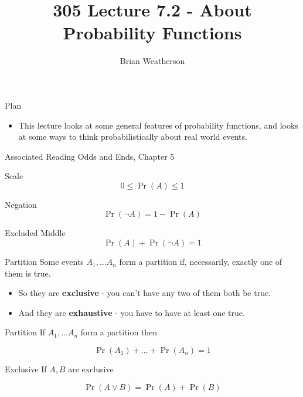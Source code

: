 \documentclass[
  ignorenonframetext,
]{beamer}
\title{305 Lecture 7.2 - About Probability Functions}
\author{Brian Weatherson}
\date{}
\providecommand{\tightlist}{%
  \setlength{\itemsep}{0pt}\setlength{\parskip}{0pt}}
\renewcommand{\,}{\text{, }}
\begin{document}
\frame{\titlepage}

\begin{frame}{Plan}
\protect\hypertarget{plan}{}
\begin{itemize}
\tightlist
\item
  This lecture looks at some general features of probability functions,
  and looks at some ways to think probabilistically about real world
  events.
\end{itemize}
\end{frame}

\begin{frame}{Associated Reading}
\protect\hypertarget{associated-reading}{}
Odds and Ends, Chapter 5
\end{frame}

\begin{frame}{Scale}
\protect\hypertarget{scale}{}
\[
0 \leq \Pr(A) \leq 1
\]
\end{frame}

\begin{frame}{Negation}
\protect\hypertarget{negation}{}
\[
\Pr(\neg A) = 1 - \Pr(A)
\]
\end{frame}

\begin{frame}{Excluded Middle}
\protect\hypertarget{excluded-middle}{}
\[
\Pr(A) + \Pr(\neg A) = 1
\]
\end{frame}

\begin{frame}{Partition}
\protect\hypertarget{partition}{}
Some events \(A_1, \dots A_n\) form a partition if, necessarily, exactly
one of them is true.

\begin{itemize}
\tightlist
\item
  So they are \textbf{exclusive} - you can't have any two of them both
  be true.
\item
  And they are \textbf{exhaustive} - you have to have at least one true.
\end{itemize}
\end{frame}

\begin{frame}{Partition}
\protect\hypertarget{partition-1}{}
If \(A_1, \dots A_n\) form a partition then

\[
\Pr(A_1) + \dots + \Pr(A_n) = 1
\]
\end{frame}

\begin{frame}{Exclusive}
\protect\hypertarget{exclusive}{}
If \(A, B\) are exclusive

\[
\Pr(A \vee B) = \Pr(A) + \Pr(B)
\]
\end{frame}
\end{document}
